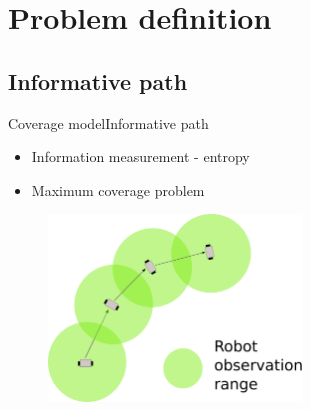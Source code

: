\section{Problem definition}

\subsection{Informative path}

\begin{frame}{Coverage model}{Informative path}

\begin{itemize}
\item Information measurement - entropy 
\item Maximum coverage problem
\end{itemize}

\begin{figure}
\centering
\includegraphics[width = 0.6\textwidth]{./figure/robotObservation}
\end{figure}

\end{frame}

